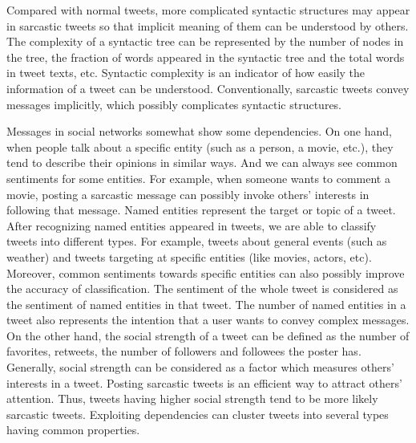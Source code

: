 Compared with normal tweets, more complicated syntactic structures may appear in sarcastic tweets so that implicit meaning of them can be understood by others. The complexity of a syntactic tree can be represented by the number of nodes in the tree, the fraction of words appeared in the syntactic tree and the total words in tweet texts, etc. Syntactic complexity is an indicator of how easily the information of a tweet can be understood. Conventionally, sarcastic tweets convey messages implicitly, which possibly complicates syntactic structures.

Messages in social networks somewhat show some dependencies. On one hand, when people talk about a specific entity (such as a person, a movie, etc.), they tend to describe their opinions in similar ways. And we can always see common sentiments for some entities. For example, when someone wants to comment a movie, posting a sarcastic message can possibly invoke others' interests in following that message. Named entities represent the target or topic of a tweet. After recognizing named entities appeared in tweets, we are able to classify tweets into different types. For example, tweets about general events (such as weather) and tweets targeting at specific entities (like movies, actors, etc). Moreover, common sentiments towards specific entities can also possibly improve the accuracy of classification. The sentiment of the whole tweet is considered as the sentiment of named entities in that tweet. The number of named entities in a tweet also represents the intention that a user wants to convey complex messages. On the other hand, the social strength of a tweet can be defined as the number of favorites, retweets, the number of followers and followees the poster has. Generally, social strength can be considered as a factor which measures others' interests in a tweet. Posting sarcastic tweets is an efficient way to attract others' attention. Thus, tweets having higher social strength tend to be more likely sarcastic tweets. Exploiting dependencies can cluster tweets into several types having common properties. 


\\

